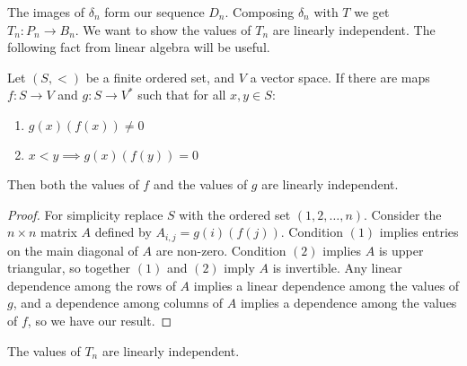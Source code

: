 \documentclass[11pt]{article} %
\begin{document}
The images of $\delta_n$ form our sequence $D_n$. Composing $\delta_n$ with $T$ we get $T_n:P_n \rightarrow B_n$. We want to show the values of $T_n$ are linearly independent. The following fact from linear algebra will be useful.

\begin{lemma} Let $(S,<)$ be a finite ordered set, and $V$ a vector space. If there are maps $f:S \rightarrow V$ and $g:S \rightarrow V^*$ such that for all $x,y \in S$:
\begin{enumerate}
\item $g(x)(f(x)) \neq 0$
\item $x<y \implies g(x)(f(y))=0$
\end{enumerate}
Then both the values of $f$ and the values of $g$ are linearly independent.
\end{lemma}
\begin{proof}
For simplicity replace $S$ with the ordered set $(1,2,\dots,n)$. Consider the $n \times n$ matrix $A$ defined by $A_{i,j}=g(i)(f(j))$. Condition $(1)$ implies entries on the main diagonal of $A$ are non-zero. Condition $(2)$ implies $A$ is upper triangular, so together $(1)$ and $(2)$ imply $A$ is invertible. Any linear dependence among the rows of $A$ implies a linear dependence among the values of $g$, and a dependence among columns of $A$ implies a dependence among the values of $f$, so we have our result.
\end{proof}
\begin{prop}
The values of $T_n$ are linearly independent. 
\end{prop}
\end{document}
